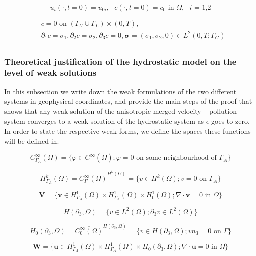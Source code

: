 \documentclass[11pt]{article}
\begin{document}
    \begin{equation} \label{HNSC7}   
    u_i (\cdot, t=0) = u_{0 i}, \text{ } c (\cdot, t=0) = c_0 \text{ in } \Omega, \text{ $i$ = 1,2}
    \end{equation}
    
    \begin{equation} \label{HNSC8}
      \begin{split}
        &c = 0 \text{ on } ( \Gamma_U \cup \Gamma_L) \times (0,T), \\
        & \partial_1 c = \sigma_1, \partial_2 c = \sigma_2, \partial_3  c = 0, \boldsymbol{\sigma} = (\sigma_1, \sigma_2, 0) \in L^2(0,T; \Gamma_G)\\
      \end{split}
    \end{equation}

\subsubsection{Theoretical justification of the hydrostatic model on the level of weak solutions}

In this subsection we write down the weak formulations of the two diffe\-rent systems in geophysical coordinates, and provide the main steps of the proof that shows that any weak solution of the anisotropic merged velocity -- pollution system converges to a weak solution of the hydrostatic system as $\epsilon$ goes to zero. In order to state the respective weak forms, we define the spaces these functions will be defined in.

 \[ C^{\infty}_{\Gamma_A} (\Omega) = \{ \varphi \in C^\infty (\bar{\Omega}); \varphi = 0 \text{ on some neighbourhood of } \Gamma_A \} \]
  
  \[ H^k_{\Gamma_A} (\Omega) = \overline{C_\Gamma ^ \infty (\Omega)} ^ {H^k (\Omega)} = \{ v \in H^k(\Omega); v=0 \text{ on } \Gamma_A \} \]
  
  \[ \mathbf{V} = \{ \mathbf{v} \in  H^1_{\Gamma_A} (\Omega) \times H^1_{\Gamma_A} (\Omega) \times H^1_0 (\Omega); \nabla \cdot \mathbf{v} = 0 \text{ in } \Omega \} \]
  
  \[ H (\partial_3, \Omega) = \{ v \in L^2(\Omega); \partial_3 v \in L^2 (\Omega)\} \]
  
  \[ H_0 (\partial_3, \Omega) = \overline{C_0 ^\infty (\Omega)}^{H (\partial_3, \Omega)} = \{ v \in H(\partial_3, \Omega); v n_3 = 0 \text{ on } \Gamma \} \]
  
  \[ \mathbf{W} = \{ \mathbf{u} \in  H^1_{\Gamma_A} (\Omega) \times H^1_{\Gamma_A} (\Omega) \times H_0 (\partial_3, \Omega); \nabla \cdot \mathbf{u} = 0 \text{ in } \Omega \} \]
  
\end{document}
